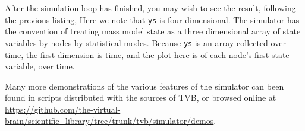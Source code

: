 After the simulation loop has finished, you may wish to see the
result, following the previous listing, 
\noindent Here we note that \texttt{ys} is four dimensional. The 
simulator has the convention of treating  mass model state as a
three dimensional array of state variables by nodes by statistical
modes. Because \texttt{ys} is an array collected over time, the first
dimension is time, and the plot here is of each node's first state
variable, over time.

Many more demonstrations of the various features of the simulator
can been found in scripts distributed with the sources of TVB, or 
browsed online at \url{https://github.com/the-virtual-brain/scientific_library/tree/trunk/tvb/simulator/demos}.


